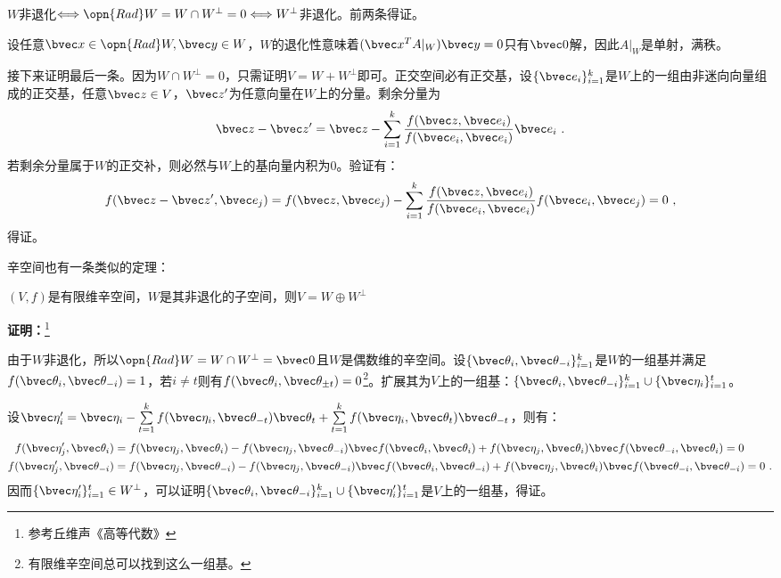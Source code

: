 $W$非退化$\Longleftrightarrow \opn{Rad}W=W\cap W^{\bot}=0\Longleftrightarrow  W^{\bot}$非退化。前两条得证。

设任意$\bvec x\in \opn{Rad} W,\bvec y\in W$，$W$的退化性意味着$(\bvec x^{T}A|_{W})\bvec  y=0$只有$\bvec 0$解，因此$A|_{W}$是单射，满秩。

接下来证明最后一条。因为$W\cap W^{\bot}=0$，只需证明$V=W+W^{\bot}$即可。正交空间必有正交基，设$\{\bvec e_i\}_{i=1}^k$是$W$上的一组由非迷向向量组成的正交基，任意$\bvec z\in V$，$\bvec z'$为任意向量在$W$上的分量。剩余分量为
\begin{equation}
\bvec z-\bvec z'=\bvec z-\sum\limits_{i=1}^k\frac{f(\bvec z,\bvec e_i)}{f(\bvec e_i,\bvec e_i)}\bvec e_i~.
\end{equation}
若剩余分量属于$W$的正交补，则必然与$W$上的基向量内积为$0$。验证有：
\begin{equation}
f(\bvec z-\bvec z',\bvec e_j)=f(\bvec z,\bvec e_j)-\sum\limits_{i=1}^k\frac{f(\bvec z,\bvec e_i)}{f(\bvec e_i,\bvec e_i)}f(\bvec e_i,\bvec e_j)=0~,
\end{equation}
得证。

辛空间也有一条类似的定理：
\begin{theorem}{}\label{the_OrSp_2}
$(V,f)$是有限维辛空间，$W$是其非退化的子空间，则$V=W\oplus W^{\bot}$
\end{theorem}
\textbf{证明：}\footnote{参考丘维声《高等代数》}

由于$W$非退化，所以$\opn{Rad} W=W\cap W^{\bot}={\bvec 0}$且$W$是偶数维的辛空间。设$\{\bvec \theta_i,\bvec \theta_{-i}\}_{i=1}^k$是$W$的一组基并满足$f(\bvec \theta_i,\bvec\theta_{-i})=1$，若$i\neq t$则有$f(\bvec\theta_i,\bvec\theta_{\pm t})= 0$\footnote{有限维辛空间总可以找到这么一组基。}。扩展其为$V$上的一组基：$\{\bvec \theta_i,\bvec \theta_{-i}\}_{i=1}^k\cup\{\bvec \eta_i\}_{i=1}^{t}$。

设$\bvec \eta'_i=\bvec\eta_i-\sum\limits_{t=1}^kf(\bvec \eta_i,\bvec \theta_{-t})\bvec\theta_t+\sum\limits_{t=1}^kf(\bvec\eta_i,\bvec\theta_t)\bvec\theta_{-t}$，则有：
\begin{equation}
\begin{aligned}
f(\bvec \eta'_j,\bvec  \theta_i)&=f(\bvec \eta_j,\bvec  \theta_i)-f(\bvec\eta_j,\bvec  \theta_{-i})\bvec f(\bvec \theta_i,\bvec \theta_i)+f(\bvec\eta_j,\bvec \theta_i)\bvec f(\bvec \theta_{-i},\bvec \theta_{i})=0\\
f(\bvec \eta'_j,\bvec  \theta_{-i})&=f(\bvec \eta_j,\bvec  \theta_{-i})-f(\bvec\eta_j,\bvec  \theta_{-i})\bvec f(\bvec \theta_i,\bvec \theta_{-i})+f(\bvec\eta_j,\bvec \theta_i)\bvec f(\bvec \theta_{-i},\bvec \theta_{-i})=0~.
\end{aligned}
\end{equation}
因而$\{\bvec \eta'_i\}_{i=1}^t\in W^{\bot}$，可以证明$\{\bvec \theta_i,\bvec \theta_{-i}\}_{i=1}^k\cup\{\bvec \eta'_i\}_{i=1}^t$是$V$上的一组基，得证。


